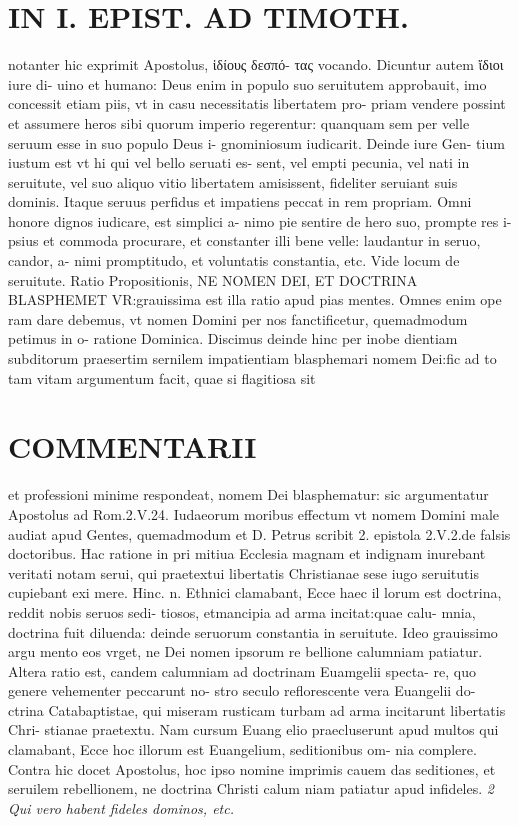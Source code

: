 \documentclass{article}
\begin{document}
\begin{pages}
\section*{IN I. EPIST. AD TIMOTH. }
\marginpar{[ p.145 ]}\pstart notanter hic exprimit Apostolus, ἱδίους δεσπό- τας vocando. Dicuntur autem ἴδιοι iure di- uino et humano: Deus enim in populo suo seruitutem approbauit, imo concessit etiam piis, vt in casu necessitatis libertatem pro- priam vendere possint et assumere heros sibi quorum imperio regerentur: quanquam sem per velle seruum esse in suo populo Deus i- gnominiosum iudicarit. Deinde iure Gen- tium iustum est vt hi qui vel bello seruati es- sent, vel empti pecunia, vel nati in seruitute, vel suo aliquo vitio libertatem amisissent, fideliter seruiant suis dominis. Itaque seruus perfidus et impatiens peccat in rem propriam. Omni honore dignos iudicare, est simplici a- nimo pie sentire de hero suo, prompte res i- psius et commoda procurare, et constanter illi bene velle: laudantur in seruo, candor, a- nimi promptitudo, et voluntatis constantia, etc. Vide locum de seruitute.  \pend\pstart Ratio Propositionis, NE NOMEN DEI, ET DOCTRINA BLASPHEMET VR:grauissima est illa ratio apud pias mentes. Omnes enim ope ram dare debemus, vt nomen Domini per nos fanctificetur, quemadmodum petimus in o- ratione Dominica. Discimus deinde hinc per inobe dientiam subditorum praesertim sernilem impatientiam blasphemari nomem Dei:fic ad to tam vitam argumentum facit, quae si flagitiosa sit  \pend
\marginpar{[ p.146 ]}
\section*{COMMENTARII }\pstart et professioni minime respondeat, nomem Dei blasphematur: sic argumentatur Apostolus ad Rom.2.V.24. Iudaeorum moribus effectum vt nomem Domini male audiat apud Gentes, quemadmodum et D. Petrus scribit 2. epistola 2.V.2.de falsis doctoribus. Hac ratione in pri mitiua Ecclesia magnam et indignam inurebant veritati notam serui, qui praetextui libertatis Christianae sese iugo seruitutis cupiebant exi mere. Hinc. n. Ethnici clamabant, Ecce haec il lorum est doctrina, reddit nobis seruos sedi- tiosos, etmancipia ad arma incitat:quae calu- mnia, doctrina fuit diluenda: deinde seruorum constantia in seruitute. Ideo grauissimo argu mento eos vrget, ne Dei nomen ipsorum re bellione calumniam patiatur. Altera ratio est, candem calumniam ad doctrinam Euamgelii specta- re, quo genere vehementer peccarunt no- stro seculo reflorescente vera Euangelii do- ctrina Catabaptistae, qui miseram rusticam turbam ad arma incitarunt libertatis Chri- stianae praetextu. Nam cursum Euang elio praecluserunt apud multos qui clamabant, Ecce hoc illorum est Euangelium, seditionibus om- nia complere. Contra hic docet Apostolus, hoc ipso nomine imprimis cauem das seditiones, et seruilem rebellionem, ne doctrina Christi calum niam patiatur apud infideles.  \pend
\textit{2 Qui vero habent fideles dominos, etc. }

\end{pages}
\end{document}
